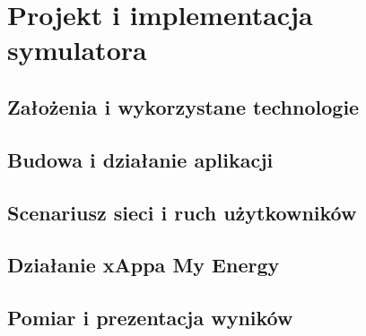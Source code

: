 \chapter{Projekt i implementacja symulatora}
\label{chap:3}

\section{Założenia i wykorzystane technologie}
\label{sec:3:1}

\section{Budowa i działanie aplikacji}
\label{sec:3:2}

\section{Scenariusz sieci i ruch użytkowników}
\label{sec:3:3}

\section{Działanie xAppa My Energy}
\label{sec:3:4}

\section{Pomiar i prezentacja wyników}
\label{sec:3:5}
